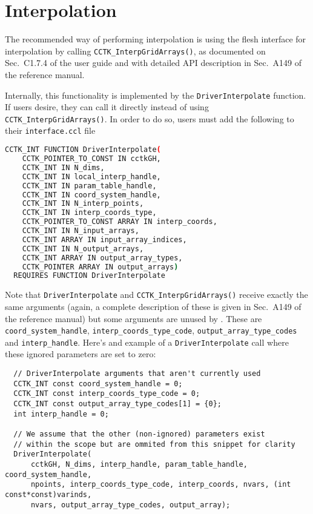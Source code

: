 \section{Interpolation}
\label{sec:interpolation}

The recommended way of performing interpolation is using the flesh interface for interpolation by calling \texttt{CCTK\_InterpGridArrays()}, as documented on Sec.~C1.7.4 of the \Cactus\space user guide and with detailed API description in Sec.~A149 of the \Cactus\space reference manual.

Internally, this functionality is implemented by the \texttt{DriverInterpolate} function. If users desire, they can call it directly instead of using \texttt{CCTK\_InterpGridArrays()}. In order to do so, users must add the following to their \texttt{interface.ccl} file
%
\begin{lstlisting}[language=bash]
  CCTK_INT FUNCTION DriverInterpolate(
    CCTK_POINTER_TO_CONST IN cctkGH,
    CCTK_INT IN N_dims,
    CCTK_INT IN local_interp_handle,
    CCTK_INT IN param_table_handle,
    CCTK_INT IN coord_system_handle,
    CCTK_INT IN N_interp_points,
    CCTK_INT IN interp_coords_type,
    CCTK_POINTER_TO_CONST ARRAY IN interp_coords,
    CCTK_INT IN N_input_arrays,
    CCTK_INT ARRAY IN input_array_indices,
    CCTK_INT IN N_output_arrays,
    CCTK_INT ARRAY IN output_array_types,
    CCTK_POINTER ARRAY IN output_arrays)
  REQUIRES FUNCTION DriverInterpolate
\end{lstlisting}

Note that \texttt{DriverInterpolate} and \texttt{CCTK\_InterpGridArrays()} receive exactly the same arguments (again, a complete description of these is given in Sec.~A149 of the \Cactus\space reference manual) but some arguments are unused by \CarpetX. These are \texttt{coord\_system\_handle}, \texttt{interp\_coords\_type\_code}, \texttt{output\_array\_type\_codes} and \texttt{interp\_handle}. Here's and example of a \texttt{DriverInterpolate} call where these ignored parameters are set to zero:

\begin{lstlisting}
  // DriverInterpolate arguments that aren't currently used
  CCTK_INT const coord_system_handle = 0;
  CCTK_INT const interp_coords_type_code = 0;
  CCTK_INT const output_array_type_codes[1] = {0};
  int interp_handle = 0;

  // We assume that the other (non-ignored) parameters exist
  // within the scope but are ommited from this snippet for clarity
  DriverInterpolate(
      cctkGH, N_dims, interp_handle, param_table_handle, coord_system_handle,
      npoints, interp_coords_type_code, interp_coords, nvars, (int const*const)varinds,
      nvars, output_array_type_codes, output_array);
\end{lstlisting}

